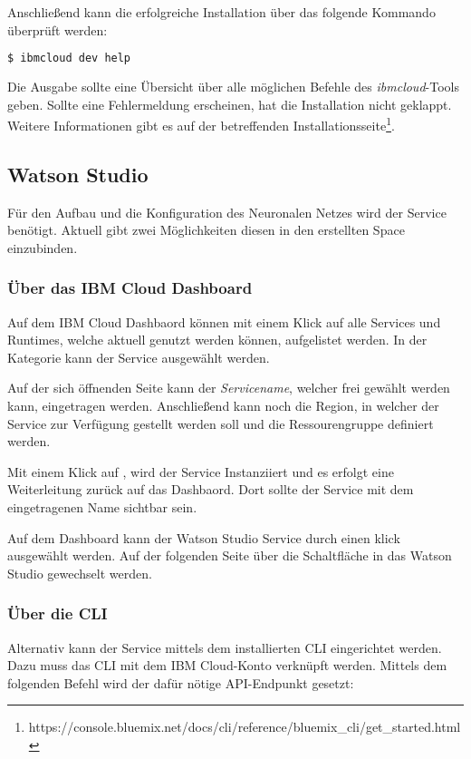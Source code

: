 Anschließend kann die erfolgreiche Installation über das folgende Kommando überprüft werden:

\begin{lstlisting}[language=bash, caption=Installation des CLI überprüfen, label=Installation des CLI überprüfen]
    $ ibmcloud dev help
\end{lstlisting}

Die Ausgabe sollte eine Übersicht über alle möglichen Befehle des \textit{ibmcloud}-Tools geben. Sollte eine Fehlermeldung
erscheinen, hat die Installation nicht geklappt. Weitere Informationen gibt es auf der betreffenden
Installationsseite\footnote{https://console.bluemix.net/docs/cli/reference/bluemix\_cli/get\_started.html}.

\subsection{Watson Studio}
Für den Aufbau und die Konfiguration des Neuronalen Netzes wird der Service  benötigt. Aktuell gibt
zwei Möglichkeiten diesen in den erstellten Space einzubinden.

\subsubsection*{Über das IBM Cloud Dashboard}
Auf dem IBM Cloud Dashbaord können mit einem Klick auf  alle Services und Runtimes, welche aktuell genutzt
werden können, aufgelistet werden. In der Kategorie  kann der Service 
ausgewählt werden.

Auf der sich öffnenden Seite kann der \textit{Servicename}, welcher frei gewählt werden kann, eingetragen werden. Anschließend
kann noch die Region, in welcher der Service zur Verfügung gestellt werden soll und die Ressourengruppe definiert werden.

Mit einem Klick auf , wird der Service Instanziiert und es erfolgt eine Weiterleitung zurück auf das
Dashbaord. Dort sollte der Service mit dem eingetragenen Name sichtbar sein.

Auf dem Dashboard kann der Watson Studio Service durch einen klick ausgewählt werden. Auf der folgenden Seite über die
Schaltfläche  in das Watson Studio gewechselt werden.

\subsubsection*{Über die CLI}
Alternativ kann der Service mittels dem installierten CLI eingerichtet werden. Dazu muss das CLI mit dem IBM
Cloud-Konto verknüpft werden. Mittels dem folgenden Befehl wird der dafür nötige API-Endpunkt gesetzt:

